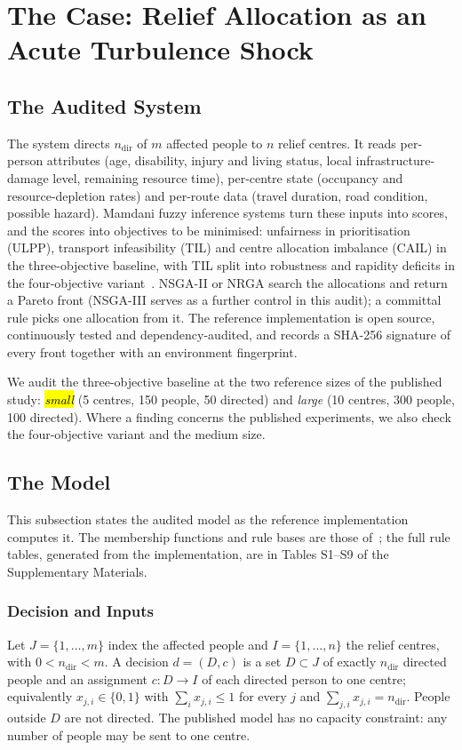 \documentclass[systems,article,accept,moreauthors,pdftex]{Definitions/mdpi}
\begin{document}
\section{The Case: Relief Allocation as an Acute Turbulence Shock}\label{sec:case}

\subsection{The Audited System}
The system directs $n_{\mathrm{dir}}$ of $m$ affected people to $n$ relief centres. It
reads per-person attributes (age, disability, injury and living status, local
infrastructure-damage level, remaining resource time), per-centre state (occupancy and
resource-depletion rates) and per-route data (travel duration, road condition, possible
hazard). Mamdani fuzzy inference systems turn these inputs into scores, and the scores
into objectives to be minimised: unfairness in prioritisation (ULPP), transport
infeasibility (TIL) and centre allocation imbalance (CAIL) in the three-objective
baseline, with TIL split into robustness and rapidity deficits in the four-objective
variant~\cite{rabiei2026resilient}. NSGA-II or NRGA search the allocations and return a
Pareto front (NSGA-III serves as a further control in this audit); a committal rule picks one allocation from it. The reference
implementation is open source, continuously tested and dependency-audited, and records a
SHA-256 signature of every front together with an environment fingerprint.

We audit the three-objective baseline at the two reference sizes of the published study:
\emph{\hl{small}%
} (5 centres, 150 people, 50 directed) and \emph{large} (10 centres, 300
people, 100 directed). Where a finding concerns the published experiments, we also check
the four-objective variant and the medium size.

\subsection{The Model}\label{sec:model}
This subsection states the audited model as the reference implementation computes it. The
membership functions and rule bases are those of~\cite{rabiei2026resilient}; the full rule
tables, generated from the implementation, are in Tables S1--S9 of the Supplementary Materials.

\subsubsection{Decision and Inputs}
Let $J=\{1,\dots,m\}$ index the affected people and $I=\{1,\dots,n\}$ the relief centres, with
$0<n_{\mathrm{dir}}<m$. A decision $d=(D,c)$ is a set $D\subset J$ of exactly $n_{\mathrm{dir}}$
directed people and an assignment $c\colon D\to I$ of each directed person to one centre;
equivalently $x_{j,i}\in\{0,1\}$ with $\sum_{i}x_{j,i}\le 1$ for every $j$ and
$\sum_{j,i}x_{j,i}=n_{\mathrm{dir}}$. People outside $D$ are not directed. The published model
has no capacity constraint: any number of people may be sent to one centre.
\end{document}
